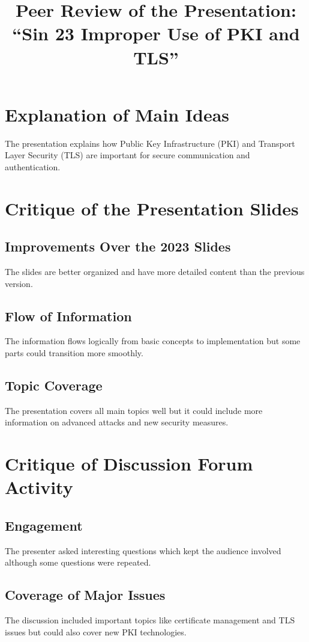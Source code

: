 \documentclass{article}
\title{Peer Review of the Presentation: “Sin 23 Improper Use of PKI and TLS”}
\author{}
\date{}
\begin{document}
\maketitle

\section{Explanation of Main Ideas}
The presentation explains how Public Key Infrastructure (PKI) and Transport Layer Security (TLS) are important for secure communication and authentication.

\section{Critique of the Presentation Slides}
\subsection{Improvements Over the 2023 Slides}
The slides are better organized and have more detailed content than the previous version.

\subsection{Flow of Information}
The information flows logically from basic concepts to implementation but some parts could transition more smoothly.

\subsection{Topic Coverage}
The presentation covers all main topics well but it could include more information on advanced attacks and new security measures.

\section{Critique of Discussion Forum Activity}
\subsection{Engagement}
The presenter asked interesting questions which kept the audience involved although some questions were repeated.

\subsection{Coverage of Major Issues}
The discussion included important topics like certificate management and TLS issues but could also cover new PKI technologies.
\end{document}
